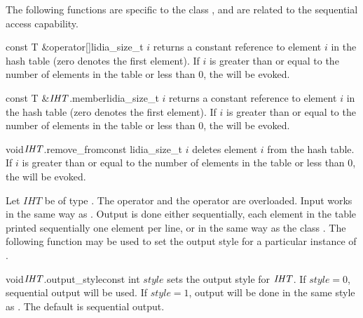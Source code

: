 The following functions are specific to the class , and are
related to the sequential access capability.

\begin{cfcode}{const T &}{operator[]}{lidia_size_t $i$}
  returns a constant reference to element $i$ in the hash table (zero denotes the first
  element).  If $i$ is greater than or equal to the number of elements in the table or less than
  $0$, the \LEH will be evoked.
\end{cfcode}

\begin{cfcode}{const T &}{$\mathit{IHT}$.member}{lidia_size_t $i$}
  returns a constant reference to element $i$ in the hash table (zero denotes the first
  element).  If $i$ is greater than or equal to the number of elements in the table or less than
  $0$, the \LEH will be evoked.
\end{cfcode}

\begin{fcode}{void}{$\mathit{IHT}$.remove_from}{const lidia_size_t $i$}
  deletes element $i$ from the hash table.  If $i$ is greater than or equal to the number of
  elements in the table or less than $0$, the \LEH will be evoked.
\end{fcode}



\IO

Let $IHT$ be of type .  The  operator \code{>>} and
the  operator \code{<<} are overloaded.  Input works in the same way as
.  Output is done either sequentially, each element in the table printed
sequentially one element per line, or in the same way as the class .  The
following function may be used to set the output style for a particular instance of
.

\begin{fcode}{void}{$\mathit{IHT}$.output_style}{const int $\mathit{style}$}
  sets the output style for $\mathit{IHT}$.  If $\mathit{style} = 0$, sequential output will be used.
  If $\mathit{style} = 1$, output will be done in the same style as .  The
  default is sequential output.
\end{fcode}



\SEEALSO

